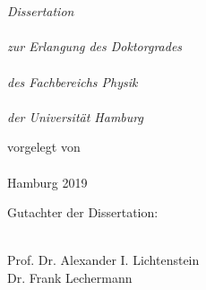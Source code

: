 \documentclass[
12pt, %
english, %
singlespacing, %
liststotoc, %
headsepline, %
]{MastersDoctoralThesis} %
\author{Viktor \textsc{Valmispild}} %
\numberwithin{equation}{section}
\begin{document}
\EveryShipout{%
      \ifthenelse{\isodd{\value{page}}}%
          {\global\marginparsep=-3cm}%
              {\global\marginparsep=.8cm}%
              }
\frontmatter %
\pagestyle{plain} %
\begin{titlepage}
\begin{center}

\HRule \\[0.4cm] %
{\huge \bfseries \ttitle\par}\vspace{0.4cm} %
\HRule \\[1.5cm] %
\vfill

\Large \textit{Dissertation\\~\\zur Erlangung des Doktorgrades\\~\\des Fachbereichs Physik\\~\\der Universität Hamburg}\\[0.3cm] %
    \vspace{1cm} 
    
\vfill
\Large vorgelegt von\\
\authorname\\

    \vspace{1cm} 
\Large Hamburg 2019
 
\vfill
\end{center}
\end{titlepage}

\vspace*{5cm}
\begin{minipage}{0.43\linewidth}
Gutachter der Dissertation: \\
\, \\
\end{minipage}
\begin{minipage}{1\linewidth}
Prof. Dr. Alexander I. Lichtenstein \\
Dr. Frank Lechermann \\
\end{minipage}
\vspace{1cm}
\end{document}
